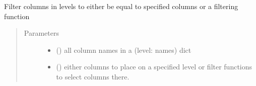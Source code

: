 \documentclass[letterpaper,10pt,english]{sphinxmanual}
\begin{document}

\begin{fulllineitems}
\label{\detokenize{dalio.util:dalio.util.level_utils.filter_levels}}
Filter columns in levels to either be equal to specified
columns or a filtering function
\begin{quote}\begin{description}
\item[{Parameters}] \leavevmode\begin{itemize}
\item {} 
 () \textendash{} all column names in a (level: names) dict

\item {} 
 (\sphinxstyleliteralemphasis{\sphinxupquote{, }}\sphinxstyleliteralemphasis{\sphinxupquote{, }}\sphinxstyleliteralemphasis{\sphinxupquote{, }}) \textendash{} either columns to place on
a specified level or filter functions to select columns there.

\end{itemize}

\end{description}\end{quote}

\end{fulllineitems}

\end{document}
